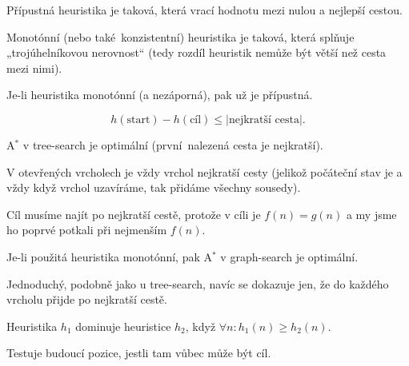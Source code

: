 \documentclass[12pt]{article}					%
\begin{document}
\begin{definice}
	Přípustná heuristika je taková, která vrací hodnotu mezi nulou a nejlepší cestou.

	Monotónní (nebo také konzistentní) heuristika je taková, která splňuje „trojúhelníkovou nerovnost“ (tedy rozdíl heuristik nemůže být větší než cesta mezi nimi).
\end{definice}

\begin{tvrzeni}
	Je-li heuristika monotónní (a nezáporná), pak už je přípustná.

	\begin{dukazin}
		$$ h(\text{start}) - h(\text{cíl}) ≤ |\text{nejkratší cesta}|. $$
	\end{dukazin}
\end{tvrzeni}

\begin{tvrzeni}
	A$^*$ v tree-search je optimální (první nalezená cesta je nejkratší).

	\begin{dukazin}
		V otevřených vrcholech je vždy vrchol nejkratší cesty (jelikož počáteční stav je a vždy když vrchol uzavíráme, tak přidáme všechny sousedy).

		Cíl musíme najít po nejkratší cestě, protože v cíli je $f(n) = g(n)$ a my jsme ho poprvé potkali při nejmenším $f(n)$.
	\end{dukazin}
\end{tvrzeni}

\begin{tvrzeni}
	Je-li použitá heuristika monotónní, pak A$^*$ v graph-search je optimální.

	\begin{dukazin}
		Jednoduchý, podobně jako u tree-search, navíc se dokazuje jen, že do každého vrcholu přijde po nejkratší cestě.
	\end{dukazin}
\end{tvrzeni}

\begin{definice}[Dominance]
	Heuristika $h_1$ dominuje heuristice $h_2$, když $\forall n: h_1(n) ≥ h_2(n)$.
\end{definice}


\begin{definice}
	Testuje budoucí pozice, jestli tam vůbec může být cíl.
\end{definice}
\end{document}
